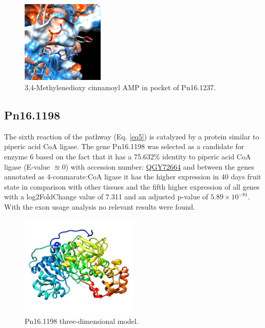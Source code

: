 \documentclass[12pt]{article}
\begin{document}
	\FloatBarrier
	
		
	\FloatBarrier
	\begin{figure}[h!]
		\centering
		\includegraphics[width=0.35\textwidth]{../6/known/Dock/chimera.png}
		\caption{3,4-Methylenedioxy cinnamoyl AMP in pocket of Pn16.1237.}
		\label{fig6k_5}
	\end{figure}
	\FloatBarrier

	\subsection{Pn16.1198}
	
	The sixth reaction of the pathway (Eq. \ref{eq5}) is catalyzed by a protein similar to piperic acid CoA ligase. The gene Pn16.1198 was selected as a candidate for enzyme 6 based on the fact that it has a 75.632\% identity to piperic acid CoA ligase (E-value $\approxeq 0$) with accession number: \href{https://www.ncbi.nlm.nih.gov/protein/QGY72664.1/}{QGY72664} and between the genes annotated as 4-coumarate:CoA ligase it has the higher expression in 40 days fruit state in comparison with other tissues and the  fifth higher expression of all genes with a log2FoldChange value of 7.311 and an adjusted p-value of $5.89\times10^{-81}$.  With the exon usage analysis no relevant results were found.
	
	\FloatBarrier
	\begin{figure}
		\centering
		\includegraphics[width=0.5\textwidth]{../6/propose/Minimize/model2.png}
		\caption{Pn16.1198 three-dimensional model.}
		\label{fig6p_1}
	\end{figure}
	\FloatBarrier
	
\end{document}
